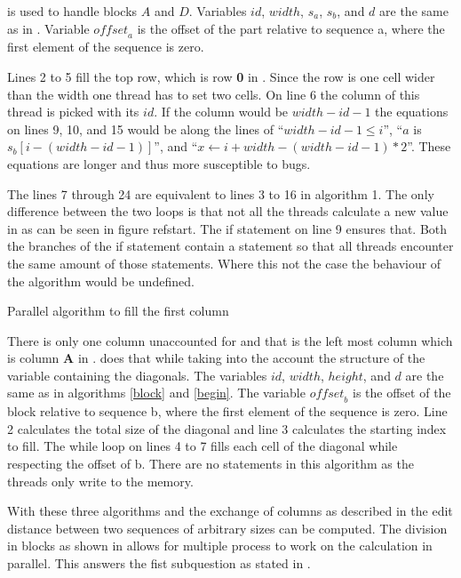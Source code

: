  is used to handle blocks $A$ and $D$.
Variables $id$, $width$, $s_a$, $s_b$, and $d$ are the same as in .
Variable $\mathit{offset}_a$ is the offset of the part relative to sequence a, where the first element of the sequence is zero.

Lines 2 to 5 fill the top row, which is row \textbf{0} in .
Since the row is one cell wider than the width one thread has to set two cells.
On line 6 the column of this thread is picked with its $id$.
If the column would be $width - id - 1$ the equations on lines 9, 10, and 15 would be along the lines of ``$width - id - 1 \leq i$'', ``$a$ is $s_b[i-(width-id-1)]$'', and ``$x \gets i + width - (width - id - 1) * 2$''.
These equations are longer and thus more susceptible to bugs.

The lines 7 through 24 are equivalent to lines 3 to 16 in algorithm 1.
The only difference between the two loops is that not all the threads calculate a new value in  as can be seen in figure ref{start}.
The if statement on line 9 ensures that.
Both the branches of the if statement contain a  statement so that all threads encounter the same amount of those statements.
Where this not the case the behaviour of the algorithm would be undefined.

\begin{algorithm}[p]
\caption{Parallel algorithm to fill the first column} \label{fill_column}
\begin{algorithmic}[1]
    \EndWhile
\EndProcedure
\end{algorithmic}
\end{algorithm}

There is only one column unaccounted for and that is the left most column which is column \textbf{A} in .
 does that while taking into the account the structure of the variable containing the diagonals.
The variables $id$, $width$, $height$, and $d$ are the same as in algorithms \ref{block} and \ref{begin}.
The variable $\mathit{offset}_b$ is the offset of the block relative to sequence b, where the first element of the sequence is zero.
Line 2 calculates the total size of the diagonal and line 3 calculates the starting index to fill.
The while loop on lines 4 to 7 fills each cell of the diagonal while respecting the offset of b.
There are no  statements in this algorithm as the threads only write to the memory.

With these three algorithms and the exchange of columns as described in  the edit distance between two sequences of arbitrary sizes can be computed.
The division in blocks as shown in  allows for multiple process to work on the calculation in parallel.
This answers the fist subquestion as stated in .

